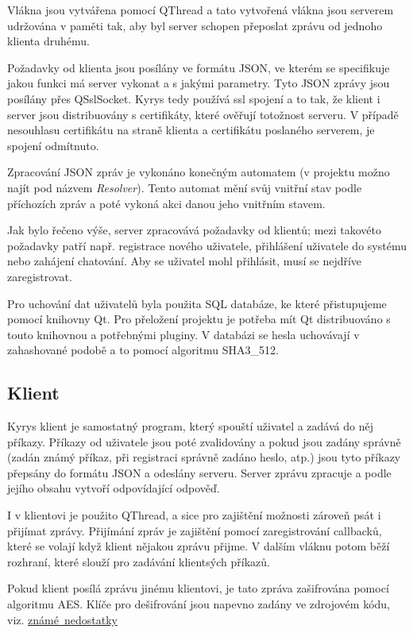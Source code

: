 \documentclass[a4paper]{article}
\begin{document}
Vlákna jsou vytvářena pomocí QThread a tato vytvořená vlákna jsou serverem udržována v paměti tak, aby byl server schopen přeposlat zprávu od jednoho klienta druhému.

Požadavky od klienta jsou posílány ve formátu JSON, ve kterém se specifikuje jakou funkci má server vykonat a s jakými parametry. Tyto JSON zprávy jsou posílány přes QSslSocket.
Kyrys tedy používá ssl spojení a to tak, že klient i server jsou distribuovány s certifikáty, které ověřují totožnost serveru. V případě nesouhlasu certifikátu na straně klienta a certifikátu poslaného serverem, je spojení odmítnuto.

Zpracování JSON zpráv je vykonáno konečným automatem (v projektu možno najít pod názvem \textit{Resolver}). Tento automat mění svůj vnitřní stav podle příchozích zpráv a poté vykoná akci danou jeho vnitřním stavem.

Jak bylo řečeno výše, server zpracovává požadavky od klientů; mezi takovéto požadavky patří např. registrace nového uživatele, přihlášení uživatele do systému nebo zahájení chatování. Aby se uživatel mohl přihlásit, musí se nejdříve zaregistrovat.

Pro uchování dat uživatelů byla použita SQL databáze, ke které přistupujeme pomocí knihovny Qt. Pro přeložení projektu je potřeba mít Qt distribuováno s touto knihovnou a potřebnými pluginy. V databázi se hesla uchovávají v zahashované podobě a to pomocí algoritmu SHA3\_512.

\subsection{Klient}

Kyrys klient je samostatný program, který spouští uživatel a zadává do něj příkazy. Příkazy od uživatele jsou poté zvalidovány a pokud jsou zadány správně (zadán známý příkaz, při registraci správně zadáno heslo, atp.) jsou tyto příkazy přepsány do formátu JSON a odeslány serveru. Server zprávu zpracuje a podle jejího obsahu vytvoří odpovídající odpověď.

I v klientovi je použito QThread, a sice pro zajištění možnosti zároveň psát i přijímat zprávy. Přijímání zpráv je zajištění pomocí zaregistrování callbacků, které se volají když klient nějakou zprávu přijme. V dalším vláknu potom běží rozhraní, které slouží pro zadávání klientsých příkazů.

Pokud klient posílá zprávu jinému klientovi, je tato zpráva zašifrována pomocí algoritmu AES. Klíče pro de\/šifrování jsou napevno zadány ve zdrojovém kódu, viz. \hyperref[sec:unfinished]{známé\ nedostatky}
\end{document}
